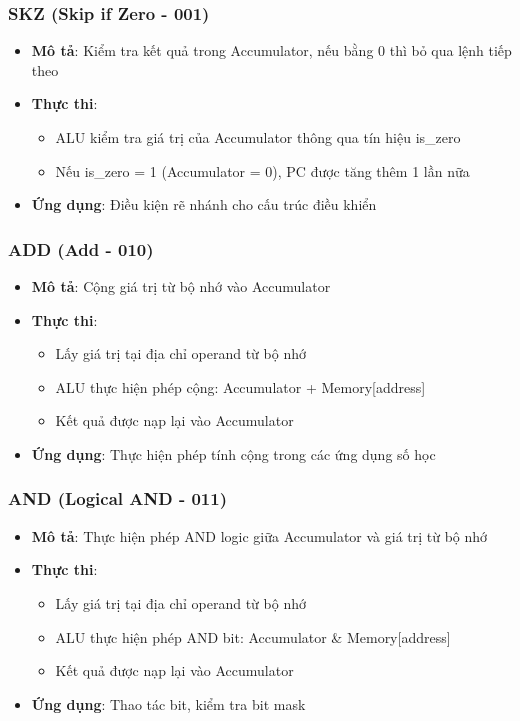 \subsubsection{SKZ (Skip if Zero - 001)}
\begin{itemize}
    \item \textbf{Mô tả}: Kiểm tra kết quả trong Accumulator, nếu bằng 0 thì bỏ qua lệnh tiếp theo
    \item \textbf{Thực thi}:
    \begin{itemize}
        \item ALU kiểm tra giá trị của Accumulator thông qua tín hiệu is\_zero
        \item Nếu is\_zero = 1 (Accumulator = 0), PC được tăng thêm 1 lần nữa
    \end{itemize}
    \item \textbf{Ứng dụng}: Điều kiện rẽ nhánh cho cấu trúc điều khiển
\end{itemize}

\subsubsection{ADD (Add - 010)}
\begin{itemize}
    \item \textbf{Mô tả}: Cộng giá trị từ bộ nhớ vào Accumulator
    \item \textbf{Thực thi}:
    \begin{itemize}
        \item Lấy giá trị tại địa chỉ operand từ bộ nhớ
        \item ALU thực hiện phép cộng: Accumulator + Memory[address]
        \item Kết quả được nạp lại vào Accumulator
    \end{itemize}
    \item \textbf{Ứng dụng}: Thực hiện phép tính cộng trong các ứng dụng số học
\end{itemize}

\subsubsection{AND (Logical AND - 011)}
\begin{itemize}
    \item \textbf{Mô tả}: Thực hiện phép AND logic giữa Accumulator và giá trị từ bộ nhớ
    \item \textbf{Thực thi}:
    \begin{itemize}
        \item Lấy giá trị tại địa chỉ operand từ bộ nhớ
        \item ALU thực hiện phép AND bit: Accumulator \& Memory[address]
        \item Kết quả được nạp lại vào Accumulator
    \end{itemize}
    \item \textbf{Ứng dụng}: Thao tác bit, kiểm tra bit mask
\end{itemize}

